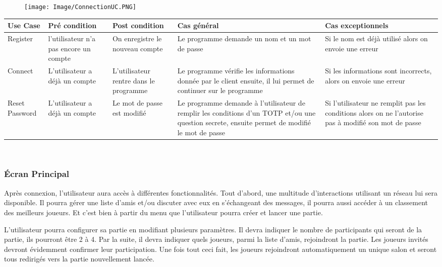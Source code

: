\documentclass[french, utf8]{article}
\begin{document}
\begin{figure}[ht]
     \centering
    \texttt{[image: Image/ConnectionUC.PNG]}

\end{figure}
\begin{center}
\begin{tabular}{|m{3cm}|m{3cm}|m{3cm}|m{3cm}|m{3cm}|}
\hline  Use Case & Pré condition      &  Post condition  & Cas général & Cas exceptionnels\\
\hline Register& l'utilisateur n'a pas  encore un compte & On enregistre le nouveau compte & Le programme demande un nom et un mot de passe & Si le nom est déjà utilisé alors on envoie une erreur  \\
\hline Connect  & L'utilisateur a déjà un compte & L'utilisateur rentre dans le programme & Le programme vérifie les informations donnée par le client ensuite, il lui permet de continuer sur le programme & Si les informations sont incorrects, alors on envoie une erreur \\
\hline Reset Password  & L'utilisateur a déjà un compte & Le mot de passe est modifié & Le programme demande à l'utilisateur de remplir les conditions d'un TOTP et/ou une question secrete, ensuite permet de modifié le mot de passe & Si l'utilisateur ne remplit pas les conditions alors on ne l'autorise pas à modifié son mot de passe \\
\hline
\end{tabular}\\
\end{center}
\subsubsection{Écran Principal}
\label{sec:MenuPrincipalUser}
Après connexion, l'utilisateur aura accès à différentes fonctionnalités. Tout d'abord, une multitude d'interactions utilisant un réseau lui sera disponible. Il pourra gérer une liste d'amis et/ou discuter avec eux en s'échangeant des messages, il pourra aussi accéder à un  classement des meilleurs joueurs. Et c'est bien à partir du menu que l'utilisateur pourra créer et lancer une partie. \newline


L'utilisateur pourra configurer sa partie en modifiant plusieurs paramètres. Il devra indiquer le nombre de participants qui seront de la partie, ils pourront être 2 à 4. Par la suite, il devra indiquer quels joueurs, parmi la liste d'amis, rejoindront la partie. Les joueurs invités devront évidemment confirmer leur participation. Une fois tout ceci fait, les joueurs rejoindront automatiquement un unique salon et seront tous redirigés vers la partie nouvellement lancée. \newline
\end{document}
